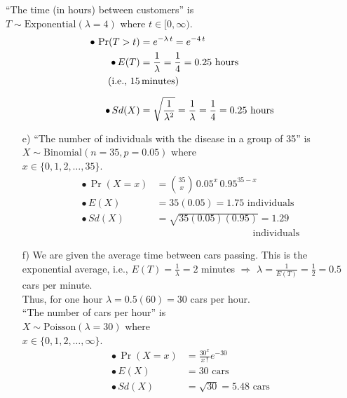 \documentclass[12pt]{article}
\begin{document}
{\begin{minipage}[t]{0.98\textwidth}
\begin{minipage}[t]{0.47\textwidth}
\begin{enumerate}[a)]
    ``The time (in hours) between customers'' is \\$T \sim \text{Exponential}(\lambda=4)$ where $t \in [0,\infty)$.
\begin{align*}
\bullet\,\Pr(T > t) &= e^{-\lambda \,t} = e^{-4 \,t}\\
\bullet\,E(T) &= \frac{1}{\lambda} = \frac{1}{4} =0.25 \text{ hours}\\
\text{(i.e., 15}& \text{\,minutes)} \\[0.2cm]
\bullet\,Sd(X) &= \sqrt{\frac{1}{\lambda^2}} = \frac{1}{\lambda} = \frac{1}{4} = 0.25 \text{ hours}
\end{align*}
\end{enumerate}
\end{minipage}\hspace{0.04\textwidth}
\begin{minipage}[t]{0.47\textwidth}
\begin{enumerate}
\item[e)] ``The number of individuals with the disease in a group of 35'' is\\
 $X \sim \text{Binomial}(n=35,p=0.05)$ where \\
    $x \in \{0,1,2,\ldots,35\}$.
\begin{align*}
\bullet\,\Pr(X = x) &= \binom{35}{x} \, 0.05^x \, 0.95^{35-x} \\[0.2cm]
\bullet\,E(X) &= 35(0.05) = 1.75 \text{ individuals}\\[0.2cm]
\bullet\,Sd(X) &= \sqrt{35(0.05)(0.95)} = 1.29\\&\hspace{4cm}\text{ individuals}
\end{align*}
\item[f)] We are given the average time between cars passing. This is the exponential average, i.e., $E(T) = \frac{1}{\lambda} = 2$ minutes $\Rightarrow$ $\lambda = \frac{1}{E(T)} = \frac{1}{2} = 0.5$ cars per minute.\\[0.2cm]
    Thus, for one hour $\lambda = 0.5(60) = 30$ cars per hour.\\[0.2cm]
 ``The number of cars per hour'' is\\ $X \sim \text{Poisson}(\lambda=30)$ where\\
    $x \in \{0,1,2,\ldots,\infty\}$.
\begin{align*}
\bullet\,\Pr(X = x) &= \frac{30^x}{x\,!}e^{-30} \\[0.2cm]
\bullet\,E(X) &= 30 \text{ cars}\\[0.2cm]
\bullet\,Sd(X) &= \sqrt{30} = 5.48 \text{ cars}

\end{align*}
\end{enumerate}
\end{minipage}
\end{minipage}}
\end{document}
